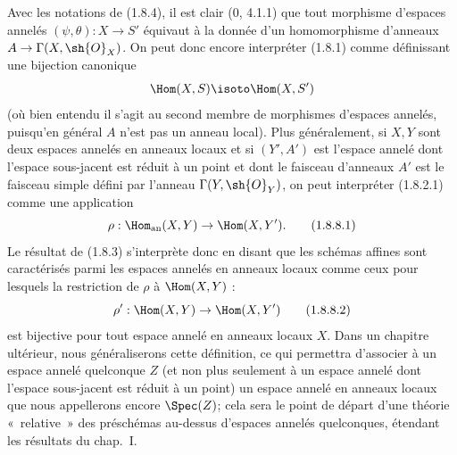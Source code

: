 \begin{env}[1.8.8]
\label{ega2:addendum:I.1.8.8-fr}
Avec les notations de (1.8.4), il est clair (0, 4.1.1) que tout
morphisme d'espaces annelés $(\psi,\theta):X\to S'$ équivaut à la
donnée d'un homomorphisme d'anneaux
$A\to\Gamma(X,\sh{O}_X)$. On peut donc encore interpréter (1.8.1)
comme définissant une bijection canonique
\[
  \Hom(X,S)\isoto\Hom(X,S')
\]
(où bien entendu il s'agit au second membre de morphismes d'espaces
annelés, puisqu'en général $A$ n'est pas un anneau local). Plus
généralement, si $X,Y$ sont deux espaces annelés en anneaux locaux et
si $(Y',A')$ est l'espace annelé dont l'espace sous-jacent est réduit à
un point et dont le faisceau d'anneaux $A'$ est le faisceau simple
défini par l'anneau $\Gamma(Y,\sh{O}_Y)$, on peut interpréter
(1.8.2.1) comme une application
\begin{equation}
\label{ega2:addendum:I.1.8.8.1-fr}
  \rho:\Hom_{\mathrm{an}}(X,Y)\to\Hom(X,Y').
\tag{1.8.8.1}
\end{equation}
Le résultat de (1.8.3) s'interprète donc en disant que les schémas
affines sont caractérisés parmi les espaces annelés en anneaux locaux
comme ceux pour lesquels la restriction de $\rho$ à $\Hom(X,Y)$ :
\begin{equation}
\label{ega2:addendum:I.1.8.8.2-fr}
  \rho':\Hom(X,Y)\to\Hom(X,Y')
\tag{1.8.8.2}
\end{equation}
est bijective pour tout espace annelé en anneaux locaux $X$. Dans un
chapitre ultérieur, nous généraliserons cette définition, ce qui
permettra d'associer à un espace annelé quelconque $Z$ (et non plus
seulement à un espace annelé dont l'espace sous-jacent est réduit à un
point) un espace annelé en anneaux locaux que nous appellerons encore
$\Spec(Z)$; cela sera le point de départ d'une théorie «~relative~» des
préschémas au-dessus d'espaces annelés quelconques, étendant les
résultats du chap.~I.
\end{env}

